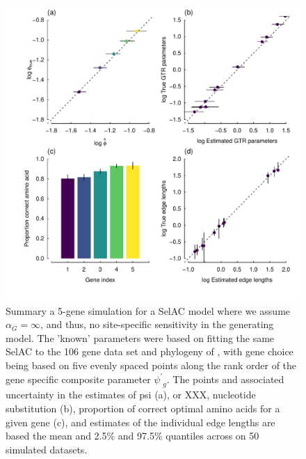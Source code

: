 \documentclass{article}
\newcommand{\alphag}{\ensuremath{\alpha_G}\xspace}
\newcommand{\psiprime}{\ensuremath{\psi^\prime}\xspace}
\begin{document}
\begin{figure}[H]
  \centering
  \includegraphics[width=0.9\linewidth]{FIGURE_S3_5genes_ALL_UNREST_Selac_NoG.pdf}
  \caption{Summary a 5-gene simulation for a SelAC model where we assume $\alphag = \infty$, and thus, no site-specific sensitivity in the generating model.
		The 'known' parameters were based on fitting the same SelAC to the 106 gene data set and phylogeny of \citet{RokasEtAl2003}, with gene choice being based on five evenly spaced points along the rank order of the gene specific composite parameter $\psiprime_g$.
		The points and associated uncertainty in the estimates of psi (a), or XXX, nucleotide substitution (b), proportion of correct optimal amino acids for a given gene (c), and estimates of the individual edge lengths are based the mean and 2.5\% and 97.5\% quantiles across on 50 simulated datasets.
} 
  \label{fig:SelacNoGSimRes}
\end{figure}
\end{document}
